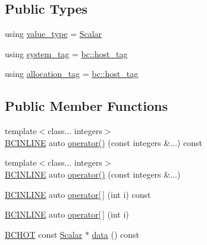 \subsection*{Public Types}
\begin{DoxyCompactItemize}
\item 
using \hyperlink{structbc_1_1tensors_1_1exprs_1_1Constexpr__Scalar__Constant_3_01Value_00_01Scalar_00_01bc_1_1device__tag_01_4_a610f17071cb3c94a8d9d0d175f2490cd}{value\+\_\+type} = \hyperlink{namespacebc_aa12ac55ee2c43dc082894dd3859daee1}{Scalar}
\item 
using \hyperlink{structbc_1_1tensors_1_1exprs_1_1Constexpr__Scalar__Constant_3_01Value_00_01Scalar_00_01bc_1_1device__tag_01_4_aabe77e73ee218b216a353a44220c572d}{system\+\_\+tag} = \hyperlink{structbc_1_1host__tag}{bc\+::host\+\_\+tag}
\item 
using \hyperlink{structbc_1_1tensors_1_1exprs_1_1Constexpr__Scalar__Constant_3_01Value_00_01Scalar_00_01bc_1_1device__tag_01_4_ae30cc6d15fe72585a06d08f7e6dae128}{allocation\+\_\+tag} = \hyperlink{structbc_1_1host__tag}{bc\+::host\+\_\+tag}
\end{DoxyCompactItemize}
\subsection*{Public Member Functions}
\begin{DoxyCompactItemize}
\item 
{\footnotesize template$<$class... integers$>$ }\\\hyperlink{common_8h_a6699e8b0449da5c0fafb878e59c1d4b1}{B\+C\+I\+N\+L\+I\+NE} auto \hyperlink{structbc_1_1tensors_1_1exprs_1_1Constexpr__Scalar__Constant_3_01Value_00_01Scalar_00_01bc_1_1device__tag_01_4_acc664067494b2986b0cee68195abfa71}{operator()} (const integers \&...) const
\item 
{\footnotesize template$<$class... integers$>$ }\\\hyperlink{common_8h_a6699e8b0449da5c0fafb878e59c1d4b1}{B\+C\+I\+N\+L\+I\+NE} auto \hyperlink{structbc_1_1tensors_1_1exprs_1_1Constexpr__Scalar__Constant_3_01Value_00_01Scalar_00_01bc_1_1device__tag_01_4_a2ff38bf33d75f4facdaab5ae01da0e9a}{operator()} (const integers \&...)
\item 
\hyperlink{common_8h_a6699e8b0449da5c0fafb878e59c1d4b1}{B\+C\+I\+N\+L\+I\+NE} auto \hyperlink{structbc_1_1tensors_1_1exprs_1_1Constexpr__Scalar__Constant_3_01Value_00_01Scalar_00_01bc_1_1device__tag_01_4_ab838f9e102c917edcfb4d514616ccf3e}{operator\mbox{[}$\,$\mbox{]}} (int i) const
\item 
\hyperlink{common_8h_a6699e8b0449da5c0fafb878e59c1d4b1}{B\+C\+I\+N\+L\+I\+NE} auto \hyperlink{structbc_1_1tensors_1_1exprs_1_1Constexpr__Scalar__Constant_3_01Value_00_01Scalar_00_01bc_1_1device__tag_01_4_a5f5f2feffd2613468fca17702e76d90a}{operator\mbox{[}$\,$\mbox{]}} (int i)
\item 
\hyperlink{common_8h_ac085f07cc309e3aac24aa3fc0a40f6d2}{B\+C\+H\+OT} const \hyperlink{namespacebc_aa12ac55ee2c43dc082894dd3859daee1}{Scalar} $\ast$ \hyperlink{structbc_1_1tensors_1_1exprs_1_1Constexpr__Scalar__Constant_3_01Value_00_01Scalar_00_01bc_1_1device__tag_01_4_a6b1ff84b9b0a07da0a8ae86314c7c732}{data} () const
\end{DoxyCompactItemize}
